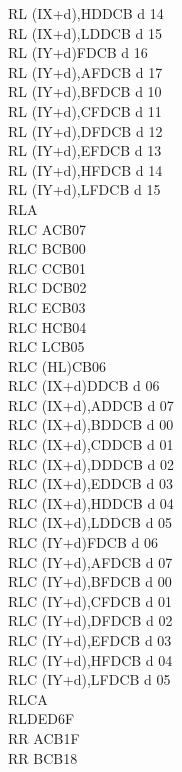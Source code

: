 \documentclass[12pt,twoside,openright,a4paper]{book}
\begin{document}
\begin{multicols}{3}
{\begin{tabbing}
		RL (IX+d),H\UNDOC\>DDCB d 14\\
		RL (IX+d),L\UNDOC\>DDCB d 15\\
		RL (IY+d)\>FDCB d 16\\
		RL (IY+d),A\UNDOC\>FDCB d 17\\
		RL (IY+d),B\UNDOC\>FDCB d 10\\
		RL (IY+d),C\UNDOC\>FDCB d 11\\
		RL (IY+d),D\UNDOC\>FDCB d 12\\
		RL (IY+d),E\UNDOC\>FDCB d 13\\
		RL (IY+d),H\UNDOC\>FDCB d 14\\
		RL (IY+d),L\UNDOC\>FDCB d 15\\
		RLA\\
		RLC A\>CB07\\
		RLC B\>CB00\\
		RLC C\>CB01\\
		RLC D\>CB02\\
		RLC E\>CB03\\
		RLC H\>CB04\\
		RLC L\>CB05\\
		RLC (HL)\>CB06\\
		RLC (IX+d)\>DDCB d 06\\
		RLC (IX+d),A\UNDOC\>DDCB d 07\\
		RLC (IX+d),B\UNDOC\>DDCB d 00\\
		RLC (IX+d),C\UNDOC\>DDCB d 01\\
		RLC (IX+d),D\UNDOC\>DDCB d 02\\
		RLC (IX+d),E\UNDOC\>DDCB d 03\\
		RLC (IX+d),H\UNDOC\>DDCB d 04\\
		RLC (IX+d),L\UNDOC\>DDCB d 05\\
		RLC (IY+d)\>FDCB d 06\\
		RLC (IY+d),A\UNDOC\>FDCB d 07\\
		RLC (IY+d),B\UNDOC\>FDCB d 00\\
		RLC (IY+d),C\UNDOC\>FDCB d 01\\
		RLC (IY+d),D\UNDOC\>FDCB d 02\\
		RLC (IY+d),E\UNDOC\>FDCB d 03\\
		RLC (IY+d),H\UNDOC\>FDCB d 04\\
		RLC (IY+d),L\UNDOC\>FDCB d 05\\
		RLCA\\
		RLD\>ED6F\\
		RR A\>CB1F\\
		RR B\>CB18\\

\end{tabbing}}
\end{multicols}
\end{document}
